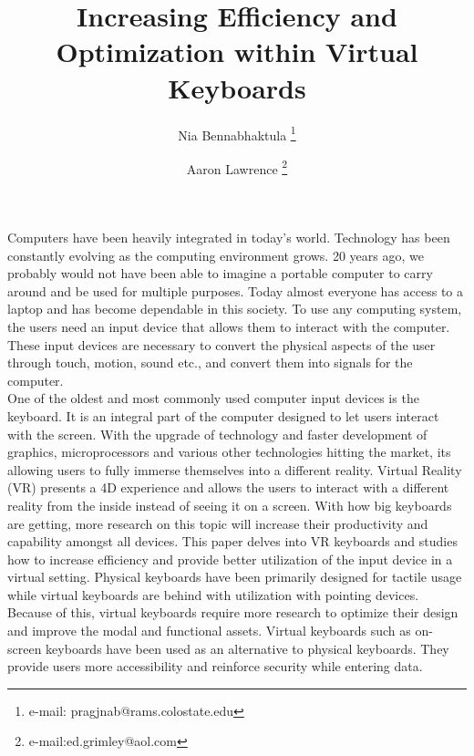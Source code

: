 \documentclass{vgtc}                          %
\title{Increasing Efficiency and Optimization within Virtual Keyboards}
\author{Nia Bennabhaktula \thanks{e-mail: pragjnab@rams.colostate.edu}\\ 
\and Aaron Lawrence \thanks{e-mail:ed.grimley@aol.com}\\ 
\affiliation{\scriptsize Colorado State University}
}
\begin{document}


\maketitle

Computers have been heavily integrated in today’s world. Technology has been constantly evolving as the computing environment grows. 20 years ago, we probably would not have been able to imagine a portable computer to carry around and be used for multiple purposes. Today almost everyone has access to a laptop and has become dependable in this society. To use any computing system, the users need an input device that allows them to interact with the computer. These input devices are necessary to convert the physical aspects of the user through touch, motion, sound etc., and convert them into signals for the computer\cite{taveria:2009}.\\[1em]
One of the oldest and most commonly used computer input devices is the keyboard\cite{taveria:2009}. It is an integral part of the computer designed to let users interact with the screen. With the upgrade of technology and faster development of graphics, microprocessors and various other technologies hitting the market, its allowing users to fully immerse themselves into a different reality\cite{mazuryk:1999}. Virtual Reality (VR) presents a 4D experience and allows the users to interact with a different reality from the inside instead of seeing it on a screen. With how big keyboards are getting, more research on this topic will increase their productivity and capability amongst all devices. This paper delves into VR keyboards and studies how to increase efficiency and provide better utilization of the input device in a virtual setting. 
Physical keyboards have been primarily designed for tactile usage while virtual keyboards are behind with utilization with pointing devices\cite{topal:2012}. Because of this, virtual keyboards require more research to optimize their design and improve the modal and functional assets. Virtual keyboards such as on-screen keyboards have been used as an alternative to physical keyboards. They provide users more accessibility and reinforce security while entering data\cite{topal:2012}.
\end{document}
